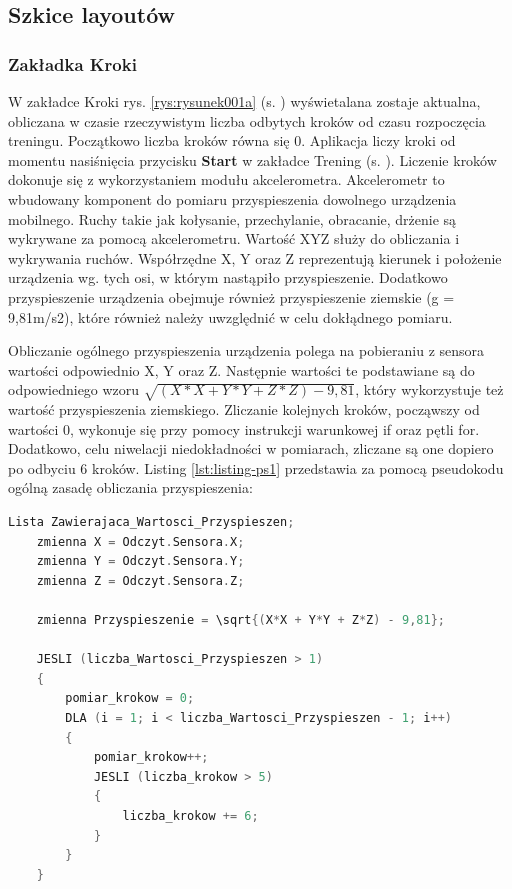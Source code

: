 \subsection{Szkice layoutów}		%

\subsubsection{Zakładka Kroki} %

\hspace{0.60cm}W zakładce Kroki rys. \ref{rys:rysunek001a} (s. \pageref{rys:rysunek001a}) wyświetalana zostaje aktualna, obliczana w czasie rzeczywistym liczba odbytych kroków od czasu rozpoczęcia treningu. Początkowo liczba kroków równa się 0. Aplikacja liczy kroki od momentu nasiśnięcia przycisku \textbf{Start} w zakładce Trening (s. \pageref{rys:rysunek001b}). Liczenie kroków dokonuje się z wykorzystaniem modułu akcelerometra. Akcelerometr to wbudowany komponent do pomiaru przyspieszenia dowolnego urządzenia mobilnego. Ruchy takie jak kołysanie, przechylanie, obracanie, drżenie są wykrywane za pomocą akcelerometru. Wartość XYZ służy do obliczania i wykrywania ruchów. Współrzędne X, Y oraz Z reprezentują kierunek i położenie urządzenia wg. tych osi, w którym nastąpiło przyspieszenie. Dodatkowo przyspieszenie urządzenia obejmuje również przyspieszenie ziemskie (g = 9,81m/s2), które również należy uwzględnić w celu dokłądnego pomiaru.

Obliczanie ogólnego przyspieszenia urządzenia polega na pobieraniu z sensora wartości odpowiednio X, Y oraz Z. Następnie wartości te podstawiane są do odpowiedniego wzoru $\sqrt{(X*X + Y*Y + Z*Z) - 9,81}$, który wykorzystuje też wartość przyspieszenia ziemskiego. Zliczanie kolejnych kroków, począwszy od wartości 0, wykonuje się przy pomocy instrukcji warunkowej if oraz pętli for. Dodatkowo, celu niwelacji niedokładności w pomiarach, zliczane są one dopiero po odbyciu 6 kroków. Listing \ref{lst:listing-ps1} przedstawia za pomocą pseudokodu ogólną zasadę obliczania przyspieszenia:

\begin{lstlisting}[caption=Pseudokod działania krokomierza, label={lst:listing-ps1}, language=C++]
	Lista Zawierajaca_Wartosci_Przyspieszen;
	zmienna X = Odczyt.Sensora.X;
	zmienna Y = Odczyt.Sensora.Y;
	zmienna Z = Odczyt.Sensora.Z;
	
	zmienna Przyspieszenie = \sqrt{(X*X + Y*Y + Z*Z) - 9,81};
	
	JESLI (liczba_Wartosci_Przyspieszen > 1)
	{
		pomiar_krokow = 0;
		DLA (i = 1; i < liczba_Wartosci_Przyspieszen - 1; i++)
		{
			pomiar_krokow++;
			JESLI (liczba_krokow > 5)
			{
				liczba_krokow += 6;
			}
		}
	}
\end{lstlisting}

